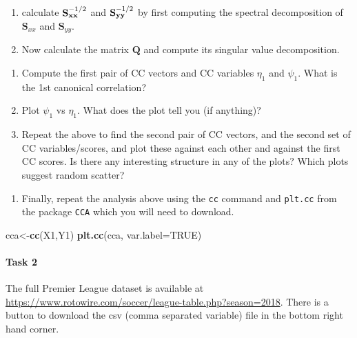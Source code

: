 \documentclass[]{book}
\newenvironment{Shaded}{\begin{snugshade}}{\end{snugshade}}
\newcommand{\DataTypeTok}[1]{\textcolor[rgb]{0.13,0.29,0.53}{#1}}
\newcommand{\KeywordTok}[1]{\textcolor[rgb]{0.13,0.29,0.53}{\textbf{#1}}}
\newcommand{\NormalTok}[1]{#1}
\newcommand{\OtherTok}[1]{\textcolor[rgb]{0.56,0.35,0.01}{#1}}
\providecommand{\tightlist}{%
  \setlength{\itemsep}{0pt}\setlength{\parskip}{0pt}}
\let\oldparagraph\paragraph
\renewcommand{\paragraph}[1]{\oldparagraph{#1}\mbox{}}
\theoremstyle{definition}
\theoremstyle{definition}
\theoremstyle{definition}
\theoremstyle{remark}
\begin{document}
\begin{enumerate}
\def\labelenumi{\roman{enumi}.}
\item
  calculate \({\bf S}_{\bf x x}^{-1/2}\) and \({\bf S}_{\bf yy}^{-1/2}\) by first computing the spectral decomposition of \(\mathbf S_{xx}\) and \(\mathbf S_{yy}\).
\item
  Now calculate the matrix \(\mathbf Q\) and compute its singular value decomposition.
\end{enumerate}

\begin{enumerate}
\def\labelenumi{\roman{enumi}.}
\setcounter{enumi}{2}
\item
  Compute the first pair of CC vectors and CC variables \(\eta_1\) and \(\psi_1\). What is the 1st canonical correlation?
\item
  Plot \(\psi_1\) vs \(\eta_1\). What does the plot tell you (if anything)?
\item
  Repeat the above to find the second pair of CC vectors, and the second set of CC variables/scores, and plot these against each other and against the first CC scores. Is there any interesting structure in any of the plots? Which plots suggest random scatter?
\end{enumerate}

\begin{enumerate}
\def\labelenumi{\roman{enumi}.}
\setcounter{enumi}{5}
\tightlist
\item
  Finally, repeat the analysis above using the \texttt{cc} command and \texttt{plt.cc} from the package \texttt{CCA} which you will need to download.
\end{enumerate}

\begin{Shaded}
\begin{Highlighting}[]
\NormalTok{cca<-}\KeywordTok{cc}\NormalTok{(X1,Y1)}
\KeywordTok{plt.cc}\NormalTok{(cca, }\DataTypeTok{var.label=}\OtherTok{TRUE}\NormalTok{)}
\end{Highlighting}
\end{Shaded}

\hypertarget{task-2}{%
\paragraph{Task 2}\label{task-2}}

The full Premier League dataset is available at
\href{https://www.rotowire.com/soccer/league-table.php?season=2019}{https://www.rotowire.com/soccer/league-table.php?season=2018}. There is a button to download the csv (comma separated variable) file in the bottom right hand corner.
\end{document}
